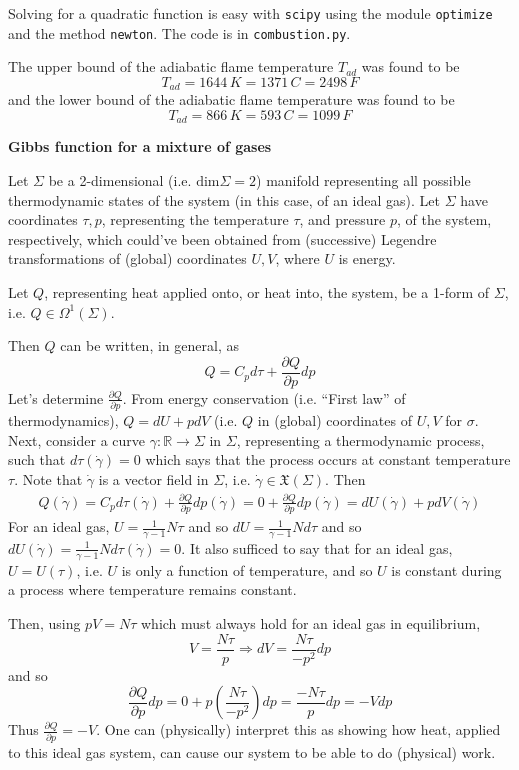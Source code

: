 \documentclass[10pt]{amsart}
\begin{document}
\begin{multicols*}{2}
Solving for a quadratic function is easy with \verb|scipy| using the module \verb|optimize| and the method \verb|newton|.  The code is in \verb|combustion.py|.  

The upper bound of the adiabatic flame temperature $T_{ad}$ was found to be
\[
T_{ad} = 1644 \, K = 1371 \, C = 2498 \, F
\]
and the lower bound of the adiabatic flame temperature was found to be 
\[
T_{ad} = 866 \, K = 593 \, C = 1099 \, F
\]

\textbf{Gibbs function for a mixture of gases}

Let $\Sigma$ be a 2-dimensional (i.e. $\text{dim}{\Sigma}=2$) manifold representing all possible thermodynamic states of the system (in this case, of an ideal gas).  Let $\Sigma$ have  coordinates $\tau,p$, representing the temperature $\tau$, and pressure $p$, of the system, respectively, which could've been obtained from (successive) Legendre transformations of (global) coordinates $U, V$, where $U$ is energy.  

Let $Q$, representing heat applied onto, or heat into, the system, be a 1-form of $\Sigma$, i.e. $Q \in \Omega^1(\Sigma)$.  

Then $Q$ can be written, in general, as 
\[
Q = C_p d\tau + \frac{ \partial Q}{ \partial p} dp
\]
Let's determine $\frac{\partial Q}{\partial p}$.  From energy conservation (i.e. ``First law'' of thermodynamics), $Q = dU + pdV$ (i.e. $Q$ in (global) coordinates of $U,V$ for $\sigma$.  Next, consider a curve $\gamma:\mathbb{R}\to \Sigma$ in $\Sigma$, representing a thermodynamic process, such that $d\tau(\dot{\gamma})=0$ which says that the process occurs at constant temperature $\tau$.  Note that $\dot{\gamma}$ is a vector field in $\Sigma$, i.e. $\dot{\gamma} \in \mathfrak{X}(\Sigma)$.  Then
\[
\begin{gathered}
  Q(\dot{\gamma}) = C_p d\tau(\dot{\gamma}) + \frac{ \partial Q}{ \partial p} dp(\dot{\gamma}) = 0 + \frac{ \partial Q}{ \partial p} dp(\dot{\gamma})= dU(\dot{\gamma}) + pdV(\dot{\gamma})
\end{gathered}
\]
For an ideal gas, $U = \frac{1}{\gamma -1} N\tau$ and so $dU = \frac{1}{\gamma-1}Nd\tau$ and so $dU(\dot{\gamma}) = \frac{1}{\gamma -1}Nd\tau(\dot{\gamma}) =0$.  It also sufficed to say that for an ideal gas, $U=U(\tau)$, i.e. $U$ is only a function of temperature, and so $U$ is constant during a process where temperature remains constant. 

Then, using $pV=N\tau$ which must always hold for an ideal gas in equilibrium, 
\[
V= \frac{N\tau}{p} \Longrightarrow dV = \frac{N\tau}{-p^2} dp
\]
and so 
\[
\frac{ \partial Q}{ \partial p } dp = 0 + p\left( \frac{N\tau}{-p^2} \right)dp = \frac{-N\tau}{p} dp = -Vdp
\]
Thus $\frac{\partial Q}{ \partial p} = -V$.  One can (physically) interpret this as showing how heat, applied to this ideal gas system, can cause our system to be able to do (physical) work.  


\end{multicols*}
\end{document}
